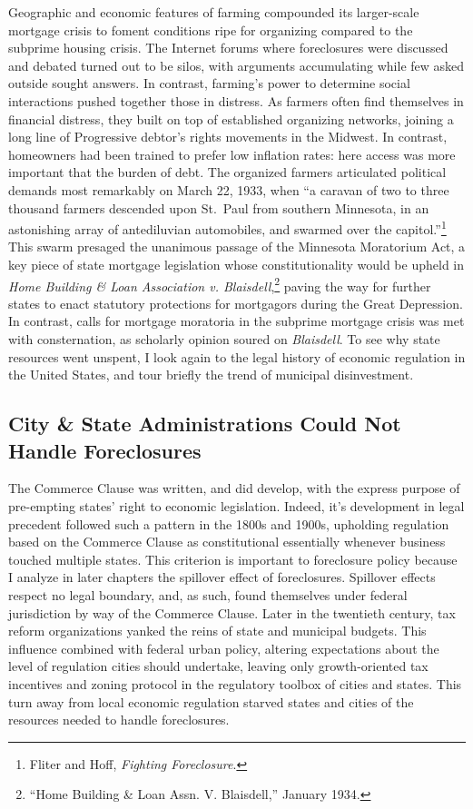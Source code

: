 \documentclass[12pt,oneside]{psthesis}
\begin{document}
Geographic and economic features of farming compounded its larger-scale mortgage crisis to foment conditions ripe for organizing compared to the subprime housing crisis.
The Internet forums where foreclosures were discussed and debated turned out to be silos, with arguments accumulating while few asked outside sought answers.
In contrast, farming's power to determine social interactions pushed together those in distress.
As farmers often find themselves in financial distress, they built on top of established organizing networks, joining a long line of Progressive debtor's rights movements in the Midwest.
In contrast, homeowners had been trained to prefer low inflation rates: here access was more important that the burden of debt.
The organized farmers articulated political demands most remarkably on March 22, 1933, when ``a caravan of two to three thousand farmers descended upon St.~Paul from southern Minnesota, in an astonishing array of antediluvian automobiles, and swarmed over the capitol.''\footnote{Fliter and Hoff, \emph{Fighting Foreclosure}.}
This swarm presaged the unanimous passage of the Minnesota Moratorium Act, a key piece of state mortgage legislation whose constitutionality would be upheld in \emph{Home Building \& Loan Association v. Blaisdell},\footnote{``Home Building \& Loan Assn. V. Blaisdell,'' January 1934.} paving the way for further states to enact statutory protections for mortgagors during the Great Depression.
In contrast, calls for mortgage moratoria in the subprime mortgage crisis was met with consternation, as scholarly opinion soured on \emph{Blaisdell}.
To see why state resources went unspent, I look again to the legal history of economic regulation in the United States, and tour briefly the trend of municipal disinvestment.

\hypertarget{cities-states}{%
\subsection{City \& State Administrations Could Not Handle Foreclosures}\label{cities-states}}

The Commerce Clause was written, and did develop, with the express purpose of pre-empting states' right to economic legislation.
Indeed, it's development in legal precedent followed such a pattern in the 1800s and 1900s, upholding regulation based on the Commerce Clause as constitutional essentially whenever business touched multiple states.
This criterion is important to foreclosure policy because I analyze in later chapters the spillover effect of foreclosures.
Spillover effects respect no legal boundary, and, as such, found themselves under federal jurisdiction by way of the Commerce Clause.
Later in the twentieth century, tax reform organizations yanked the reins of state and municipal budgets.
This influence combined with federal urban policy, altering expectations about the level of regulation cities should undertake, leaving only growth-oriented tax incentives and zoning protocol in the regulatory toolbox of cities and states.
This turn away from local economic regulation starved states and cities of the resources needed to handle foreclosures.
\end{document}
